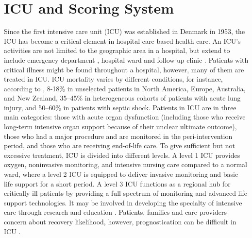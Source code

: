 \documentclass[12pt,a4paper,english
]{tunithesis}
\begin{document}
\section{ICU and Scoring System}
Since the first intensive care unit (ICU) was established in Denmark in 1953, the ICU has become a critical element in hospital-care based health care. An ICU's activities are not limited to the geographic area in a hospital, but extend to include emergency department , hospital ward and follow-up clinic \parencite{Marshell2017}. Patients with critical illness might be found throughout a hospital, however, many of them are treated in ICU. ICU mortality varies by different conditions, for instance, according to \textcite{Adhikari2010}, 8-18\% in unselected patients in North America, Europe, Australia, and New Zealand, 35–45\% in heterogeneous cohorts of patients with acute lung injury, and 50–60\% in patients with septic shock. Patients in ICU are in three main categories: those with acute organ dysfunction (including those who receive long-term intensive organ support because of their unclear ultimate outcome), those who had a major procedure and are monitored in the peri-intervention period, and those who are receiving end-of-life care. To give sufficient but not excessive treatment, ICU is divided into different levels. A level 1 ICU provides oxygen, noninvasive monitoring, and intensive nursing care compared to a normal ward, where a level 2 ICU is equipped to deliver invasive monitoring and basic life support for a short period. A level 3 ICU functions as a regional hub for critically ill patients by providing a full spectrum of monitoring and advanced life support technologies. It may be involved in developing the specialty of intensive care through research and education \parencite{Marshell2017}. Patients, families and care providers concern about recovery likelihood, however, prognostication can be difficult in ICU \parencite{Tiffany21}.
\end{document}

